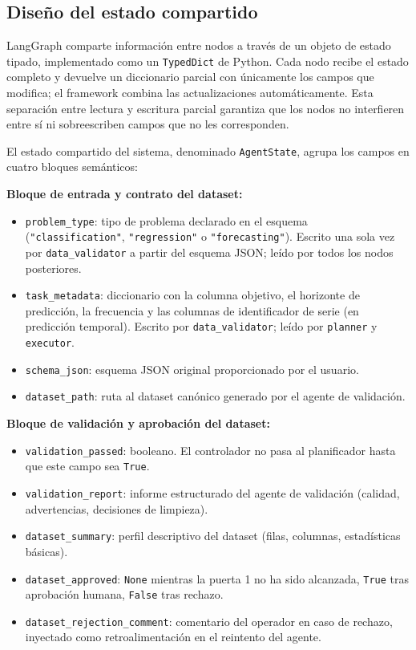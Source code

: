 \subsection{Diseño del estado compartido}
\label{sec:estado-compartido}

LangGraph comparte información entre nodos a través de un objeto de estado tipado, implementado como un \texttt{TypedDict} de Python. Cada nodo recibe el estado completo y devuelve un diccionario parcial con únicamente los campos que modifica; el framework combina las actualizaciones automáticamente. Esta separación entre lectura y escritura parcial garantiza que los nodos no interfieren entre sí ni sobreescriben campos que no les corresponden.

El estado compartido del sistema, denominado \texttt{AgentState}, agrupa los campos en cuatro bloques semánticos:

\textbf{Bloque de entrada y contrato del dataset:}
\begin{itemize}
  \item \texttt{problem\_type}: tipo de problema declarado en el esquema (\texttt{"classification"}, \texttt{"regression"} o \texttt{"forecasting"}). Escrito una sola vez por \texttt{data\_validator} a partir del esquema JSON; leído por todos los nodos posteriores.
  \item \texttt{task\_metadata}: diccionario con la columna objetivo, el horizonte de predicción, la frecuencia y las columnas de identificador de serie (en predicción temporal). Escrito por \texttt{data\_validator}; leído por \texttt{planner} y \texttt{executor}.
  \item \texttt{schema\_json}: esquema JSON original proporcionado por el usuario.
  \item \texttt{dataset\_path}: ruta al dataset canónico generado por el agente de validación.
\end{itemize}

\textbf{Bloque de validación y aprobación del dataset:}
\begin{itemize}
  \item \texttt{validation\_passed}: booleano. El controlador no pasa al planificador hasta que este campo sea \texttt{True}.
  \item \texttt{validation\_report}: informe estructurado del agente de validación (calidad, advertencias, decisiones de limpieza).
  \item \texttt{dataset\_summary}: perfil descriptivo del dataset (filas, columnas, estadísticas básicas).
  \item \texttt{dataset\_approved}: \texttt{None} mientras la puerta 1 no ha sido alcanzada, \texttt{True} tras aprobación humana, \texttt{False} tras rechazo.
  \item \texttt{dataset\_rejection\_comment}: comentario del operador en caso de rechazo, inyectado como retroalimentación en el reintento del agente.
\end{itemize}

